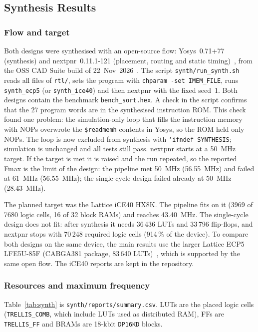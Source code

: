 \subsection{Synthesis Results}
\label{sec:synth}

\subsubsection{Flow and target}
Both designs were synthesised with an open-source flow: Yosys~0.71+77 (synthesis) and nextpnr~0.11.1-121
(placement, routing and static timing)~\cite{yogeshWolf2013,yogeshShah2019},
from the OSS CAD Suite build of 22~Nov~2026~\cite{yogeshOSSCAD}. The script
\texttt{synth/run\_synth.sh} reads all files of \texttt{rtl/}, sets the
program with \texttt{chparam -set IMEM\_FILE}, runs \texttt{synth\_ecp5} (or
\texttt{synth\_ice40}) and then nextpnr with the fixed seed~1. Both designs
contain the benchmark \texttt{bench\_sort.hex}. A check in the script confirms
that the 27 program words are in the synthesised instruction ROM. This check
found one problem: the simulation-only loop that fills the instruction memory
with NOPs overwrote the \texttt{\$readmemh} contents in Yosys, so the ROM held
only NOPs. The loop is now excluded from synthesis with
\texttt{`ifndef SYNTHESIS}; simulation is unchanged and all tests still pass.
nextpnr starts at a 50~MHz target. If the target is met it is raised and the
run repeated, so the reported Fmax is the limit of the design: the pipeline
met 50~MHz (56.55~MHz) and failed at 61~MHz (56.55~MHz); the single-cycle
design failed already at 50~MHz (28.43~MHz).

The planned target was the Lattice iCE40 HX8K. The pipeline fits on it (3969
of 7680 logic cells, 16 of 32 block RAMs) and reaches 43.40~MHz. The
single-cycle design does not fit: after synthesis it needs 36\,436 LUTs and
33\,796 flip-flops, and nextpnr stops with 70\,248 required logic cells
(914\,\% of the device). To compare both designs on the same device, the main
results use the larger Lattice ECP5 LFE5U-85F (CABGA381 package, 83\,640
LUTs)~\cite{yogeshECP5DS}, which is supported by the same open flow. The
iCE40 reports are kept in the repository.

\subsubsection{Resources and maximum frequency}
Table~\ref{tab:synth} is \texttt{synth/reports/summary.csv}. LUTs are the
placed logic cells (\texttt{TRELLIS\_COMB}, which include LUTs used as
distributed RAM), FFs are \texttt{TRELLIS\_FF} and BRAMs are 18-kbit
\texttt{DP16KD} blocks.

